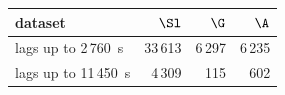 \begin{tabular}{@{}l r r r@{}}
\toprule
dataset & $\Sl$ & $\G$ & $\A$ \\
\midrule
lags up to 2\,760~s & 33\,613 & 6\,297 & 6\,235 \\
lags up to 11\,450~s & 4\,309 & 115 & 602 \\
\bottomrule
\end{tabular}
